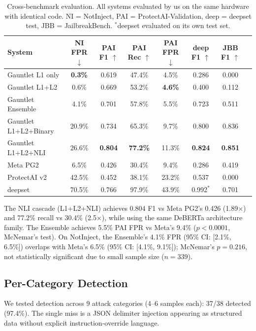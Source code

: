 \documentclass[11pt]{article}
\begin{document}
\begin{table}[t]
\centering
\small
\begin{tabular}{lccccccc}
\toprule
\textbf{System} & \textbf{NI FPR} $\downarrow$ & \textbf{PAI F1} $\uparrow$ & \textbf{PAI Rec} $\uparrow$ & \textbf{PAI FPR} $\downarrow$ & \textbf{deep F1} $\uparrow$ & \textbf{JBB F1} $\uparrow$ \\
\midrule
Gauntlet L1 only & \textbf{0.3\%} & 0.619 & 47.4\% & 4.5\% & 0.286 & 0.000 \\
Gauntlet L1+L2 & 0.6\% & 0.669 & 53.2\% & \textbf{4.6\%} & 0.400 & 0.112 \\
Gauntlet Ensemble & 4.1\% & 0.701 & 57.8\% & 5.5\% & 0.723 & 0.511 \\
Gauntlet L1+L2+Binary & 20.9\% & 0.734 & 65.3\% & 9.7\% & 0.800 & 0.836 \\
Gauntlet L1+L2+NLI & 26.6\% & \textbf{0.804} & \textbf{77.2\%} & 11.3\% & \textbf{0.824} & \textbf{0.851} \\
\midrule
Meta PG2 & 6.5\% & 0.426 & 30.4\% & 9.4\% & 0.286 & 0.419 \\
ProtectAI v2 & 42.5\% & 0.452 & 38.1\% & 23.2\% & 0.537 & 0.000 \\
deepset & 70.5\% & 0.766 & 97.9\% & 43.9\% & 0.992$^*$ & 0.701 \\
\bottomrule
\end{tabular}
\caption{Cross-benchmark evaluation. All systems evaluated by us on the same hardware with identical code. NI = NotInject, PAI = ProtectAI-Validation, deep = deepset test, JBB = JailbreakBench. $^*$deepset evaluated on its own test set.}
\label{tab:main}
\end{table}

The NLI cascade (L1+L2+NLI) achieves 0.804 F1 vs Meta PG2's 0.426 (1.89$\times$) and 77.2\% recall vs 30.4\% (2.5$\times$), while using the same DeBERTa architecture family. The Ensemble achieves 5.5\% PAI FPR vs Meta's 9.4\% ($p < 0.0001$, McNemar's test). On NotInject, the Ensemble's 4.1\% FPR (95\% CI: [2.1\%, 6.5\%]) overlaps with Meta's 6.5\% (95\% CI: [4.1\%, 9.1\%]); McNemar's $p = 0.216$, not statistically significant due to small sample size ($n = 339$).

\subsection{Per-Category Detection}

We tested detection across 9 attack categories (4--6 samples each): 37/38 detected (97.4\%). The single miss is a JSON delimiter injection appearing as structured data without explicit instruction-override language.
\end{document}

